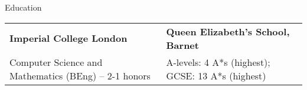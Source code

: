 \documentclass[10pt]{resume} %
\begin{document}

\begin{rSection}{Education}

\begin{center}
\begin{tabular}{ l l }
 \textbf{Imperial College London} & \textbf{Queen Elizabeth's School, Barnet} \\
  Computer Science and Mathematics (BEng) -- 2-1 honors &
  A-levels: 4 A*s (highest); GCSE: 13 A*s (highest)
\end{tabular}
\end{center}

\end{rSection}

\end{document}
